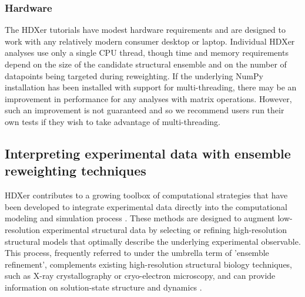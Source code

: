 \documentclass[9pt,tutorial,ASAPversion]{livecoms}
\begin{document}
\subsubsection{Hardware}
The HDXer tutorials have modest hardware requirements and are designed to work with any relatively modern consumer desktop or laptop. 
Individual HDXer analyses use only a single CPU thread, though time and memory requirements depend on the size of the candidate structural ensemble and on the number of datapoints being targeted during reweighting.
If the underlying NumPy installation has been installed with support for multi-threading, there may be an improvement in performance for any analyses with matrix operations.
However, such an improvement is not guaranteed and so we recommend users run their own tests if they wish to take advantage of multi-threading.

\subsection{Interpreting experimental data with ensemble reweighting techniques}\label{interpretingexptdata_sect}

HDXer contributes to a growing toolbox of computational strategies that have been developed to integrate experimental data directly into the computational modeling and simulation process \cite{Bonomi2017, Kofinger2019, Orioli2020}.
These methods are designed to augment low-resolution experimental structural data by selecting or refining high-resolution structural models that optimally describe the underlying experimental observable.
This process, frequently referred to under the umbrella term of 'ensemble refinement', complements existing high-resolution structural biology techniques, such as X-ray crystallography or cryo-electron microscopy, and can provide information on solution-state structure and dynamics \cite{Rozycki2011, Marinelli2015, Marinelli2019, Bottaro2018, Bengtsen2020, Cesari2016, Hustedt2018, Kofinger2019}.
\end{document}
